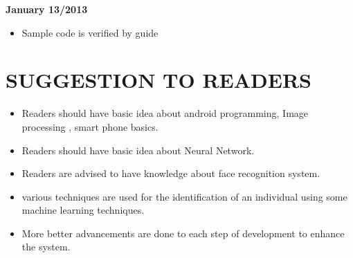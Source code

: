 \documentclass[10pt,a4paper,twoside]{report}
\begin{document}
\begin{appendix}
\begin{flushleft}
\textbf{January 13/2013}
\begin{itemize}
\item Sample code is verified by guide

\end{itemize}
 

\end{flushleft}
\section{SUGGESTION TO READERS}
\begin{itemize}
\item Readers should have basic idea about android programming, Image processing , smart phone basics.
\item Readers should have basic idea about Neural Network.
\item Readers are advised to have knowledge about face recognition system.
\item various techniques are used for the identification of an individual using some machine learning techniques.
\item More better advancements are done to each step of development to enhance the system.
\end{itemize}

\end{appendix}
\end{document}

